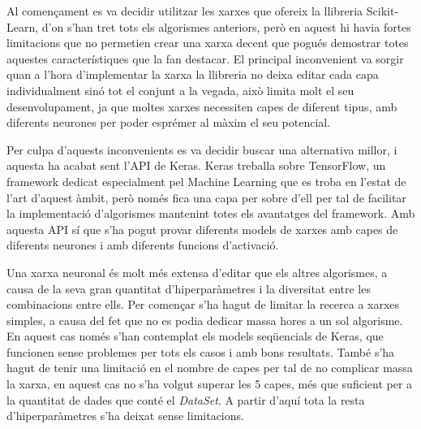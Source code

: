 \documentclass[10pt,a4paper,twocolumn,twoside]{article}
\begin{document}
Al començament es va decidir utilitzar les xarxes que ofereix la llibreria Scikit-Learn, d'on s'han tret tots els algorismes anteriors, però en aquest hi havia fortes limitacions que no permetien crear una xarxa decent que pogués demostrar totes aquestes característiques que la fan destacar. El principal inconvenient va sorgir quan a l'hora d'implementar la xarxa la llibreria no deixa editar cada capa individualment sinó tot el conjunt a la vegada, això limita molt el seu desenvolupament, ja que moltes xarxes necessiten capes de diferent tipus, amb diferents neurones per poder esprémer al màxim el seu potencial.

Per culpa d'aquests inconvenients es va decidir buscar una alternativa millor, i aquesta ha acabat sent l'API de Keras. Keras treballa sobre TensorFlow, un framework dedicat especialment pel Machine Learning que es troba en l'estat de l'art d'aquest àmbit, però només fica una capa per sobre d'ell per tal de facilitar la implementació d'algorismes mantenint totes els avantatges del framework. Amb aquesta API sí que s'ha pogut provar diferents models de xarxes amb capes de diferents neurones i amb diferents funcions d'activació.

Una xarxa neuronal és molt més extensa d'editar que els altres algorismes, a causa de la seva gran quantitat d'hiperparàmetres i la diversitat entre les combinacions entre ells. Per començar s'ha hagut de limitar la recerca a xarxes simples, a causa del fet que no es podia dedicar massa hores a un sol algorisme. En aquest cas només s'han contemplat els models seqüencials de Keras, que funcionen sense problemes per tots els casos i amb bons resultats. També s'ha hagut de tenir una limitació en el nombre de capes per tal de no complicar massa la xarxa, en aquest cas no s'ha volgut superar les 5 capes, més que suficient per a la quantitat de dades que conté el \textit{DataSet}. A partir d'aquí tota la resta d'hiperparàmetres s'ha deixat sense limitacions.
\end{document}

